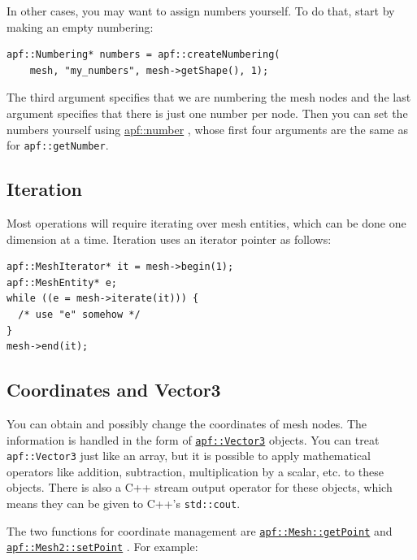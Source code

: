 \documentclass{article}
\begin{document}
In other cases, you may want to assign numbers yourself.
To do that, start by making an empty numbering:

\begin{lstlisting}
apf::Numbering* numbers = apf::createNumbering(
    mesh, "my_numbers", mesh->getShape(), 1);
\end{lstlisting}

The third argument specifies that we are numbering the mesh
nodes and the last argument specifies that there is just one
number per node.
Then you can set the numbers yourself using
\href{http://scorec.rpi.edu/~dibanez/core/namespaceapf.html#a3a8fafe58c4c2ec60a572692ffbaa1fd}{apf::number}
, whose first four arguments are the same as for
\texttt{apf::getNumber}.

\subsection{Iteration}

Most operations will require iterating over mesh entities,
which can be done one dimension at a time.
Iteration uses an iterator pointer as follows:

\begin{lstlisting}
apf::MeshIterator* it = mesh->begin(1);
apf::MeshEntity* e;
while ((e = mesh->iterate(it))) {
  /* use "e" somehow */
}
mesh->end(it);
\end{lstlisting}

\subsection{Coordinates and Vector3}

You can obtain and possibly change the coordinates of mesh nodes.
The information is handled in the form of
\href{http://scorec.rpi.edu/~dibanez/core/classapf_1_1Vector3.html#_details}{\texttt{apf::Vector3}}
objects.
You can treat \texttt{apf::Vector3} just like an array, but it is
possible to apply mathematical operators like addition, subtraction,
multiplication by a scalar, etc. to these objects.
There is also a C++ stream output operator for these objects, which
means they can be given to C++'s \texttt{std::cout}.

The two functions for coordinate management are
\href{http://scorec.rpi.edu/~dibanez/core/classapf_1_1Mesh.html#a27c491ae08a8248e292179dbd7dacb39}{\texttt{apf::Mesh::getPoint}}
and
\href{http://scorec.rpi.edu/~dibanez/core/classapf_1_1Mesh2.html#a39ad215b2b6d6b75d55819fbbc138f57}{\texttt{apf::Mesh2::setPoint}}
.
For example:
\end{document}
